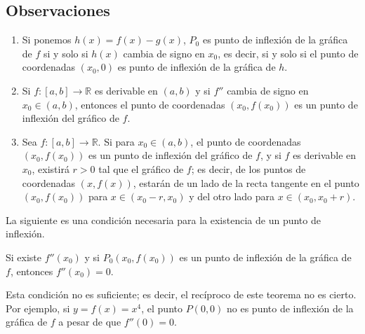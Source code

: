 \subsection*{Observaciones}
\begin{enumerate}
\item Si ponemos $h(x)=f(x)-g(x)$, $P_0$ es punto de inflexión de la gráfica de $f$ si y solo
    si $h(x)$ cambia de signo en $x_0$, es decir, si y solo si el punto de coordenadas
    $(x_0,0)$ es punto de inflexión de la gráfica de $h$.

\item Si $f\colon [a,b]\rightarrow\mathbb{R}$ es derivable en $(a,b)$ y si $f''$ cambia de signo
    en $x_{0}\in (a,b)$, entonces el punto de coordenadas $(x_{0}, f(x_{0}))$ es un punto de
    inflexión del gráfico de $f$.

\item Sea $f\colon [a,b]\rightarrow\mathbb{R}$. Si para $x_{0}\in (a,b)$, el punto de
    coordenadas $(x_{0}, f(x_{0}))$ es un punto de inflexión del gráfico de $f$, y si $f$ es
    derivable en $x_{0}$, existirá $r>0$ tal que el gráfico de $f$; es decir, de los puntos de
    coordenadas $(x,f(x))$, estarán de un lado de la recta tangente en el punto $(x_{0},
    f(x_{0}))$ para $x\in (x_{0}-r,x_{0})$ y del otro lado para $x\in (x_0,x_0+r)$.
\end{enumerate}

La siguiente es una condición necesaria para la existencia de un punto de inflexión.

\begin{teocal}
Si existe $f''(x_0)$ y si $P_0(x_0,f(x_0))$ es un punto de inflexión de la gráfica de $f$, entonces
$f''(x_0)=0$.
\end{teocal}

Esta condición no es suficiente; es decir, el recíproco de este teorema no es cierto. Por ejemplo,
si $y=f(x)=x^4$, el punto $P(0,0)$ no es punto de inflexión de la gráfica de $f$ a pesar de que
$f''(0)=0$.

